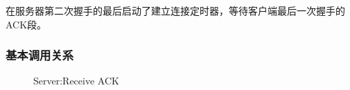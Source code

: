 			在服务器第二次握手的最后启动了建立连接定时器，等待客户端最后一次握手的ACK段。           
			\subsubsection{基本调用关系}
				\begin{figure}[htb]        
					\caption{Server:Receive ACK}
					\label{Server:Receive ACK}
				\end{figure}  
